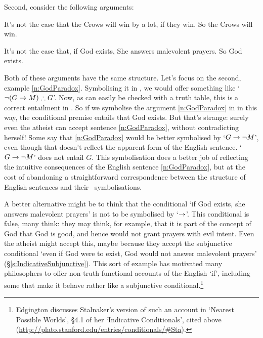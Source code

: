Second, consider the following arguments:
	\begin{earg}
	\item[\ex{crows}]  It’s not the case that the Crows will win by a lot, if they win.
So the Crows will win.
		\item[\ex{n:GodParadox}] It's not the case that, if God exists, She answers malevolent prayers. So God exists.
	\end{earg}
Both of these arguments have the same structure. Let's focus on the second, example \ref{n:GodParadox}. Symbolising it in \TFL, we would offer something like `$\neg (G \rightarrow M) \mathrel{\therefore} G$'. Now, as can easily be checked with a truth table, this is a correct entailment in \TFL. So if we symbolise the argument \ref{n:GodParadox} in \TFL in this way, the conditional premise entails that God exists. But that's strange: surely even the atheist can accept sentence \ref{n:GodParadox}, without contradicting herself! Some say that \ref{n:GodParadox} would be better symbolised by `$G \rightarrow \neg M$', even though that doesn't reflect the apparent form of the English sentence. `$G \rightarrow \neg M$' does not entail $G$. This symbolisation does a better job of reflecting the intuitive consequences of the English sentence \ref{n:GodParadox}, but at the cost of abandoning a straightforward correspondence between the structure of English sentences and their \TFL\ symbolisations. 

A better alternative might be to think that the conditional `if God exists, she answers malevolent prayers' is not to be symbolised by `$\rightarrow$'. This conditional is false, many think: they may think, for example, that it is part of the concept of God that God is good, and hence would not grant prayers with evil intent. Even the atheist might accept this, maybe because they accept the subjunctive conditional `even if God were to exist, God would not answer malevolent prayers' (§\ref{s:IndicativeSubjunctive}). This sort of example has motivated many philosophers to offer non-truth-functional accounts of the English `if', including some that make it behave rather like a subjunctive conditional.\footnote{Edgington discusses Stalnaker's version of such an account in `Nearest Possible Worlds', §4.1 of her `Indicative Conditionals', cited above (\url{http://plato.stanford.edu/entries/conditionals/\#Sta}).} 

